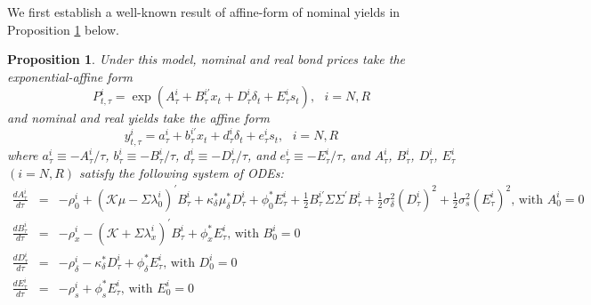 \documentclass{article}
\newtheorem{proposition}[theorem]{Proposition}
\begin{document}
We first establish a well-known result of affine-form of nominal yields in
Proposition \ref{prop_yields} below.

\begin{proposition}
\label{prop_yields}Under this model, nominal and real bond prices take the
exponential-affine form%
\begin{equation}
P_{t,\tau }^{i}=\exp \left( A_{\tau }^{i}+B_{\tau }^{i\prime }x_{t}+D_{\tau
}^{i}\delta _{t}+E_{\tau }^{i}s_{t}\right) ,\text{ }i=N,R
\end{equation}%
and nominal and real yields take the affine form%
\begin{equation}
y_{t,\tau }^{i}=a_{\tau }^{i}+b_{\tau }^{i\prime }x_{t}+d_{\tau }^{i}\delta
_{t}+e_{\tau }^{i}s_{t},\text{ }i=N,R
\end{equation}%
where $a_{\tau }^{i}\equiv -A_{\tau }^{i}/\tau $, $b_{\tau }^{i}\equiv
-B_{\tau }^{i}/\tau $, $d_{\tau }^{i}\equiv -D_{\tau }^{i}/\tau $, and $%
e_{\tau }^{i}\equiv -E_{\tau }^{i}/\tau $, and $A_{\tau }^{i}$, $B_{\tau
}^{i}$, $D_{\tau }^{i}$, $E_{\tau }^{i}$ $(i=N,R)$ satisfy the following
system of ODEs:%
\begin{eqnarray*}
\frac{dA_{\tau }^{i}}{d\tau } &=&-\rho _{0}^{i}+\left( \mathcal{K\mu }%
-\Sigma \lambda _{0}^{i}\right) ^{\prime }B_{\tau }^{i}+\kappa _{\delta
}^{\ast }\mu _{\delta }^{\ast }D_{\tau }^{i}+\phi _{0}^{\ast }E_{\tau }^{i}+%
\frac{1}{2}B_{\tau }^{i\prime }\Sigma \Sigma ^{\prime }B_{\tau }^{i}+\frac{1%
}{2}\sigma _{\delta }^{2}\left( D_{\tau }^{i}\right) ^{2}+\frac{1}{2}\sigma
_{s}^{2}\left( E_{\tau }^{i}\right) ^{2}\text{, with }A_{0}^{i}=0 \\
\frac{dB_{\tau }^{i}}{d\tau } &=&-\rho _{x}^{i}-\left( \mathcal{K}+\Sigma
\lambda _{x}^{i}\right) ^{\prime }B_{\tau }^{i}+\phi _{x}^{\ast }E_{\tau
}^{i}\text{, with }B_{0}^{i}=0 \\
\frac{dD_{\tau }^{i}}{d\tau } &=&-\rho _{\delta }^{i}-\kappa _{\delta
}^{\ast }D_{\tau }^{i}+\phi _{\delta }^{\ast }E_{\tau }^{i}\text{, with }%
D_{0}^{i}=0 \\
\frac{dE_{\tau }^{i}}{d\tau } &=&-\rho _{s}^{i}+\phi _{s}^{\ast }E_{\tau
}^{i}\text{, with }E_{0}^{i}=0
\end{eqnarray*}
\end{proposition}
\end{document}
